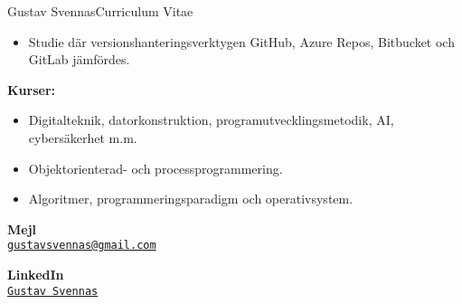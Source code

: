 \documentclass{article}
\begin{document}
\begin{cv}{Gustav Svennas}{Curriculum Vitae}

\begin{cvevent}[2023-04][2023-06]
    \begin{itemize}
        \item Studie där versionshanteringsverktygen GitHub, Azure Repos, Bitbucket och GitLab jämfördes.
    \end{itemize}
\end{cvevent}

\begin{cvevent}[2018-09][2023-09]
    \textbf{Kurser:}
    \begin{itemize}
        \item Digitalteknik, datorkonstruktion, programutvecklingsmetodik, AI, cybersäkerhet m.m.
        \item Objektorienterad- och processprogrammering. 
        \item Algoritmer, programmeringsparadigm och operativsystem.
    \end{itemize}
\end{cvevent}


\begin{cvevent}[2017-06][2020-06]
\end{cvevent}


\cvsidebar %



\begin{cvitem}[Envelope][4]
    \textbf{Mejl}\\
    \href{mailto:gustavsvennas@gmail.com}{\texttt{gustavsvennas@gmail.com}}
\end{cvitem}

\cvseparator[3]
\begin{cvitem}[Globe][4]
    \textbf{LinkedIn}\\
    \href{https://www.linkedin.com/in/gustav-svennas-18b575159}{\texttt{Gustav Svennas}}
\end{cvitem}


\end{cv}
\end{document}
